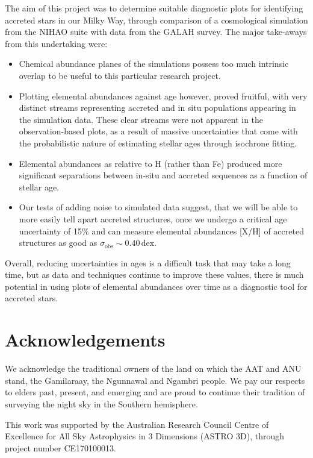 \documentclass[fleqn,usenatbib]{mnras}
\begin{document}
The aim of this project was to determine suitable diagnostic plots for identifying accreted stars in our Milky Way, through comparison of a cosmological simulation from the NIHAO suite with data from the GALAH survey. The major take-aways from this undertaking were:
\begin{itemize}
\item Chemical abundance planes of the simulations possess too much intrinsic overlap to be useful to this particular research project. 
\item Plotting elemental abundances against age however, proved fruitful, with very distinct streams representing accreted and in situ populations appearing in the simulation data. These clear streams were not apparent in the observation-based plots, as a result of massive uncertainties that come with the probabilistic nature of estimating stellar ages through isochrone fitting.
\item Elemental abundances as relative to H (rather than Fe) produced more significant separations between in-situ and accreted sequences as a function of stellar age.
\item Our tests of adding noise to simulated data suggest, that we will be able to more easily tell apart accreted structures, once we undergo a critical age uncertainty of 15\% and can measure elemental abundances [X/H] of accreted structures as good as $\sigma_\text{obs} \sim 0.40\,\mathrm{dex}$.
\end{itemize}

Overall, reducing uncertainties in ages is a difficult task that may take a long time, but as data and techniques continue to improve these values, there is much potential in using plots of elemental abundances over time as a diagnostic tool for accreted stars.

\section*{Acknowledgements}

We acknowledge the traditional owners of the land on which the AAT and ANU stand, the Gamilaraay, the Ngunnawal and Ngambri people. We pay our respects to elders past, present, and emerging and are proud to continue their tradition of surveying the night sky in the Southern hemisphere.

This work was supported by the Australian Research Council Centre of Excellence for All Sky Astrophysics in 3 Dimensions (ASTRO 3D), through project number CE170100013.
\end{document}

